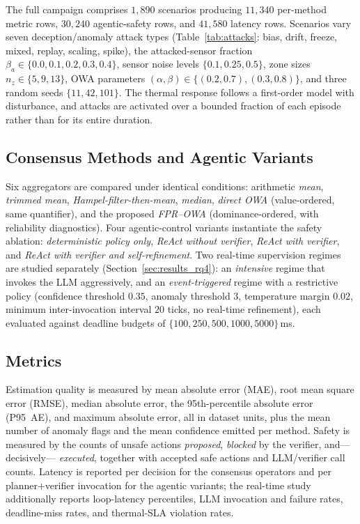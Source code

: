 The full campaign comprises $1{,}890$ scenarios producing $11{,}340$
per-method metric rows, $30{,}240$ agentic-safety rows, and $41{,}580$
latency rows. Scenarios vary seven deception/anomaly attack types
(Table~\ref{tab:attacks}: bias, drift, freeze, mixed, replay, scaling,
spike), the attacked-sensor fraction $\beta_a\in\{0.0,0.1,0.2,0.3,0.4\}$,
sensor noise levels $\{0.1,0.25,0.5\}$, zone sizes
$n_z\in\{5,9,13\}$, OWA parameters $(\alpha,\beta)\in\{(0.2,0.7),(0.3,0.8)\}$,
and three random seeds $\{11,42,101\}$. The thermal response follows a
first-order model with disturbance, and attacks are activated over a
bounded fraction of each episode rather than for its entire duration.

\subsection{Consensus Methods and Agentic Variants}
\label{sec:setup_methods}

Six aggregators are compared under identical conditions: arithmetic
\emph{mean}, \emph{trimmed mean}, \emph{Hampel-filter-then-mean},
\emph{median}, \emph{direct OWA} (value-ordered, same quantifier), and
the proposed \emph{FPR--OWA} (dominance-ordered, with reliability
diagnostics). Four agentic-control variants instantiate the safety
ablation: \emph{deterministic policy only}, \emph{ReAct without
verifier}, \emph{ReAct with verifier}, and \emph{ReAct with verifier and
self-refinement}. Two real-time supervision regimes are studied
separately (Section~\ref{sec:results_rq4}): an \emph{intensive} regime
that invokes the LLM aggressively, and an \emph{event-triggered} regime
with a restrictive policy (confidence threshold $0.35$, anomaly
threshold $3$, temperature margin $0.02$, minimum inter-invocation
interval $20$ ticks, no real-time refinement), each evaluated against
deadline budgets of $\{100,250,500,1000,5000\}$\,ms.

\subsection{Metrics}
\label{sec:setup_metrics}

Estimation quality is measured by mean absolute error (MAE), root mean
square error (RMSE), median absolute error, the 95th-percentile absolute
error (P95~AE), and maximum absolute error, all in dataset units, plus
the mean number of anomaly flags and the mean confidence emitted per
method. Safety is measured by the counts of unsafe actions
\emph{proposed}, \emph{blocked} by the verifier, and---decisively---%
\emph{executed}, together with accepted safe actions and LLM/verifier
call counts. Latency is reported per decision for the consensus
operators and per planner$+$verifier invocation for the agentic
variants; the real-time study additionally reports loop-latency
percentiles, LLM invocation and failure rates, deadline-miss rates, and
thermal-SLA violation rates.

